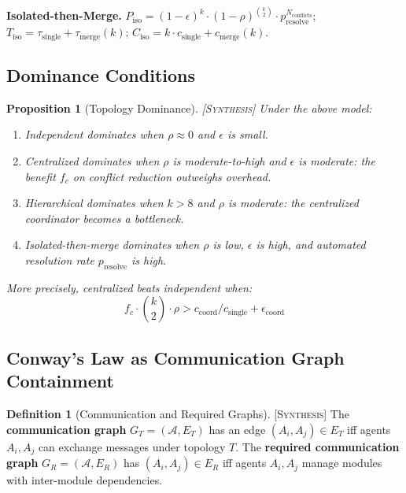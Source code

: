 \documentclass[11pt]{article}
\newtheorem{proposition}[theorem]{Proposition}
\theoremstyle{definition}
\newtheorem{definition}[theorem]{Definition}
\theoremstyle{remark}
\newcommand{\synthesis}{\textsc{[Synthesis]}}
\begin{document}
\medskip
\noindent\textbf{Isolated-then-Merge.}
$P_{\mathrm{iso}} = (1-\epsilon)^k \cdot (1-\rho)^{\binom{k}{2}} \cdot p_{\mathrm{resolve}}^{N_{\mathrm{conflicts}}}$;
$T_{\mathrm{iso}} = \tau_{\mathrm{single}} + \tau_{\mathrm{merge}}(k)$;
$C_{\mathrm{iso}} = k \cdot c_{\mathrm{single}} + c_{\mathrm{merge}}(k)$.

\subsection{Dominance Conditions}

\begin{proposition}[Topology Dominance] \synthesis{}
\label{prop:dominance}
Under the above model:
\begin{enumerate}[nosep]
  \item Independent dominates when $\rho \approx 0$ and $\epsilon$ is small.
  \item Centralized dominates when $\rho$ is moderate-to-high and $\epsilon$ is moderate: the benefit $f_c$ on conflict reduction outweighs overhead.
  \item Hierarchical dominates when $k > 8$ and $\rho$ is moderate: the centralized coordinator becomes a bottleneck.
  \item Isolated-then-merge dominates when $\rho$ is low, $\epsilon$ is high, and automated resolution rate $p_{\mathrm{resolve}}$ is high.
\end{enumerate}

More precisely, centralized beats independent when:
\begin{equation}
  f_c \cdot \binom{k}{2} \cdot \rho > c_{\mathrm{coord}} / c_{\mathrm{single}} + \epsilon_{\mathrm{coord}}
\end{equation}
\end{proposition}

\subsection{Conway's Law as Communication Graph Containment}

\begin{definition}[Communication and Required Graphs] \synthesis{}
The \textbf{communication graph} $G_T = (\mathcal{A}, E_T)$ has an edge $(A_i, A_j) \in E_T$ iff agents $A_i, A_j$ can exchange messages under topology $T$.
The \textbf{required communication graph} $G_R = (\mathcal{A}, E_R)$ has $(A_i, A_j) \in E_R$ iff agents $A_i, A_j$ manage modules with inter-module dependencies.
\end{definition}
\end{document}
